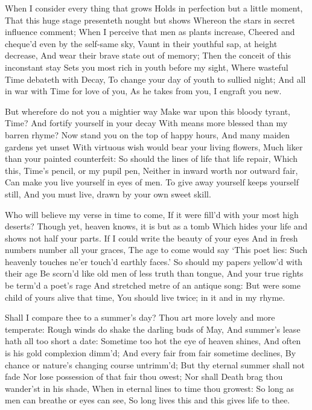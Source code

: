 \documentclass[twocolumn]{book}
\begin{document}
When I consider every thing that grows
Holds in perfection but a little moment,
That this huge stage presenteth nought but shows
Whereon the stars in secret influence comment;
When I perceive that men as plants increase,
Cheered and cheque'd even by the self-same sky,
Vaunt in their youthful sap, at height decrease,
And wear their brave state out of memory;
Then the conceit of this inconstant stay
Sets you most rich in youth before my sight,
Where wasteful Time debateth with Decay,
To change your day of youth to sullied night;
  And all in war with Time for love of you,
  As he takes from you, I engraft you new.


But wherefore do not you a mightier way
Make war upon this bloody tyrant, Time?
And fortify yourself in your decay
With means more blessed than my barren rhyme?
Now stand you on the top of happy hours,
And many maiden gardens yet unset
With virtuous wish would bear your living flowers,
Much liker than your painted counterfeit:
So should the lines of life that life repair,
\numerus*{}Which this, Time's pencil, or my pupil pen,
Neither in inward worth nor outward fair,
Can make you live yourself in eyes of men.
  To give away yourself keeps yourself still,
  And you must live, drawn by your own sweet skill.

Who will believe my verse in time to come,
If it were fill'd with your most high deserts?
Though yet, heaven knows, it is but as a tomb
Which hides your life and shows not half your parts.
If I could write the beauty of your eyes
And in fresh numbers number all your graces,
The age to come would say `This poet lies:
Such heavenly touches ne'er touch'd earthly faces.'
So should my papers yellow'd with their age
Be scorn'd like old men of less truth than tongue,
And your true rights be term'd a poet's rage
And stretched metre of an antique song:
  But were some child of yours alive that time,
  You should live twice; in it and in my rhyme.


Shall I compare thee to a summer's day?
Thou art more lovely and more temperate:
Rough winds do shake the darling buds of May,
And summer's lease hath all too short a date:
\numerus*{}Sometime too hot the eye of heaven shines,
And often is his gold complexion dimm'd;
And every fair from fair sometime declines,
By chance or nature's changing course untrimm'd;
But thy eternal summer shall not fade
\numerus*{}Nor lose possession of that fair thou owest;
Nor shall Death brag thou wander'st in his shade,
When in eternal lines to time thou growest:
  So long as men can breathe or eyes can see,
  So long lives this and this gives life to thee.
\end{document}
